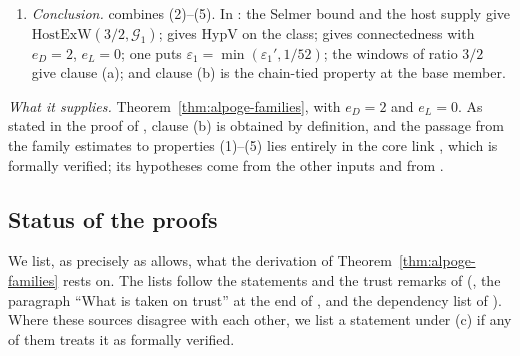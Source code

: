 \documentclass[10pt]{amsart}
\theoremstyle{definition}
\theoremstyle{remark}
\begin{document}
\begin{enumerate}
correspondence for unitary groups, the Siegel--Weil formula and the mass
of a standard lattice (\cite[Theorem~\ref{A-i4:thm-genusmass}]{Annex}); the
$26$ rows they must satisfy are reduced to their leaves in
\cite[Theorem~\ref{A-i4:A-thm-allrows}]{Annex} and
\cite[Theorem~\ref{A-i4:thm-assembly}]{Annex}. The class selection and the
hypothesis structure are \cite[Theorem~\ref{A-i4:thm-classSel}]{Annex} and
\cite[Corollary~\ref{A-i4:cor-structure}]{Annex}.
\item \emph{Conclusion.} \cite[Theorem~\ref{A-i4:thm-top}]{Annex} combines
(2)--(5). In \cite[Theorem~\ref{A-i4:thm-final}]{Annex}: the Selmer bound
and the host supply give $\mathrm{HostExW}(3/2,\mathcal G_1)$;
\cite[Lemma~\ref{A-i4:lem-hypV-cls}]{Annex} gives $\mathrm{HypV}$ on the
class; \cite[Theorem~\ref{A-i4:thm-top}]{Annex} gives connectedness with
$e_D=2$, $e_L=0$; one puts $\varepsilon_1=\min(\varepsilon_1',1/52)$; the
windows of ratio $3/2$ give clause (a); and clause (b) is the chain-tied
property at the base member.
\end{enumerate}

\emph{What it supplies.} Theorem~\ref{thm:alpoge-families}, with $e_D=2$
and $e_L=0$. As stated in the proof of
\cite[Theorem~\ref{A-i4:thm-final}]{Annex}, clause (b) is obtained by
definition, and the passage from the family estimates to properties
(1)--(5) lies entirely in the core link
\cite[Proposition~\ref{A-i4:Lprop-fam}(c)]{Annex}, which is formally
verified; its hypotheses come from the other inputs and from
\cite[Theorem~\ref{A-i4:thm-top}]{Annex}.

\subsection{Status of the proofs}\label{inp:ssec-status}

We list, as precisely as \cite{Annex} allows, what the derivation of
Theorem~\ref{thm:alpoge-families} rests on. The lists follow the
statements and the trust remarks of \cite{Annex}
(\cite[Remarks~\ref{A-i4:rem-trust}, \ref{A-i3:S-rem-trust}]{Annex}, the
paragraph ``What is taken on trust'' at the end of
\cite[\S\ref{A-i2:ssec-P1}]{Annex}, and the dependency list of
\cite[Theorem~\ref{A-i5:thm-vwin}]{Annex}). Where these sources disagree
with each other, we list a statement under (c) if any of them treats it as
formally verified.
\end{document}
